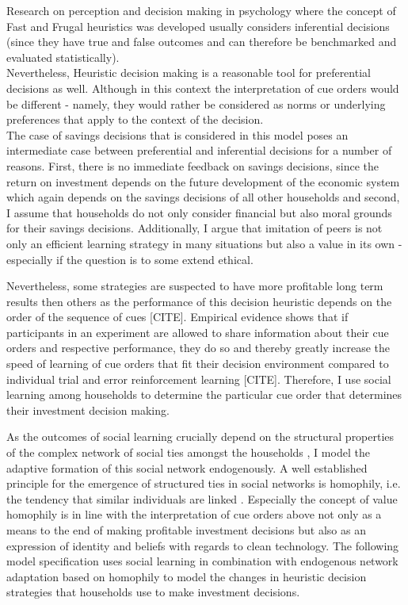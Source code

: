 Research on perception and decision making in psychology where the concept of Fast and Frugal heuristics was developed usually considers inferential decisions (since they have true and false outcomes and can therefore be benchmarked and evaluated statistically).\\
Nevertheless, Heuristic decision making is a reasonable tool for preferential decisions as well. Although in this context the interpretation of cue orders would be different - namely, they would rather be considered as norms or underlying preferences that apply to the context of the decision. \\
The case of savings decisions that is considered in this model poses an intermediate case between preferential and inferential decisions for a number of reasons. First, there is no immediate feedback on savings decisions, since the return on investment depends on the future development of the economic system which again depends on the savings decisions of all other households and second, I assume that households do not only consider financial but also moral grounds for their savings decisions.
Additionally, I argue that imitation of peers is not only an efficient learning strategy in many situations but also a value in its own - especially if the question is to some extend ethical. 

Nevertheless, some strategies are suspected to have more profitable long term results then others as the performance of this decision heuristic depends on the order of the sequence of cues [CITE]. Empirical evidence shows that if participants in an experiment are allowed to share information about their cue orders and respective performance, they do so and thereby greatly increase the speed of learning of cue orders that fit their decision environment compared to individual trial and error reinforcement learning [CITE]. Therefore, I use social learning among households to determine the particular cue order that determines their investment decision making.

As the outcomes of social learning crucially depend on the structural properties of the complex network of social ties amongst the households \cite{Barkoczi2016}, I model the adaptive formation of this social network endogenously.
A well established principle for the emergence of structured ties in social networks is homophily, i.e. the tendency that similar individuals are linked \cite{McPherson2007, Centola2007, Centola2011}. Especially the concept of value homophily \cite{McPherson2007} is in line with the interpretation of cue orders above not only as a means to the end of making profitable investment decisions but also as an expression of identity and beliefs with regards to clean technology.
The following model specification uses social learning in combination with endogenous network adaptation based on homophily to model the changes in heuristic decision strategies that households use to make investment decisions.

